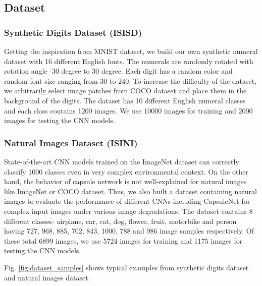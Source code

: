 \documentclass[10pt, journal, compsoc]{IEEEtran}
\begin{document}
\subsection{Dataset}
\subsubsection{Synthetic Digits Dataset (ISISD)}
Getting the inspiration from MNIST dataset, we build our own synthetic numeral dataset with 16 different English fonts. The numerals are randomly rotated with rotation angle -30 degree to 30 degree. Each digit has a random color and random font size ranging from 30 to 240. To increase the difficulty of the dataset, we arbitrarily select image patches from COCO dataset \cite{lin2014microsoft} and place them in the background of the digits. The dataset has 10 different English numeral classes and each class contains 1200 images. We use 10000 images for training and 2000 images for testing the CNN models.
\subsubsection{Natural Images Dataset (ISINI)}
State-of-the-art CNN models trained on the ImageNet dataset can correctly classify 1000 classes even in very complex environmental context. On the other hand, the behavior of capsule network is not well-explained for natural images like ImageNet or COCO dataset. Thus, we also built a dataset containing natural images to evaluate the performance of different CNNs including CapsuleNet for complex input images under various image degradations. The dataset contains 8 different classes- airplane, car, cat, dog, flower, fruit, motorbike and person having 727, 968, 885, 702, 843, 1000, 788 and 986 image samples respectively. Of these total 6899 images, we use 5724 images for training and 1175 images for testing the CNN models.

Fig. \ref{fig:dataset_samples} shows typical examples from synthetic digits dataset and natural images dataset.
\end{document}
